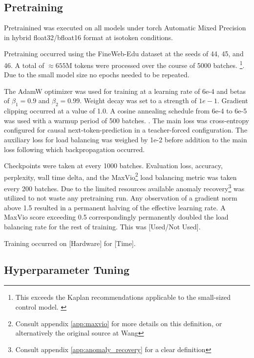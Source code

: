 \documentclass[11pt]{article}
\begin{document}
\subsection{Pretraining}

Pretrainined was executed on all models under torch Automatic Mixed Precision in hybrid float32/bfloat16 format at isotoken conditions.

Pretraining occurred using the FineWeb-Edu dataset at the seeds of 44, 45, and 46. \cite{penedo2024fineweb} A total of $\approx 655\mathrm{M}$ tokens were processed over the course of 5000 batches. \footnote{This exceeds the Kaplan recommendations applicable to the small-sized control model. \cite{kaplan2020scaling}}. Due to the small model size no epochs needed to be repeated.

The AdamW optimizer was used for training at a learning rate of 6e-4 and betas of $\beta_1=0.9$ and $\beta_2 = 0.99$. Weight decay was set to a strength of  $1e-1$. Gradient clipping occurred at a value of 1.0. A cosine annealing schedule from 6e-4 to 6e-5 was used with a warmup period of 500 batches. \cite{radford2019language}. The main loss was cross-entropy configured for causal next-token-prediction in a teacher-forced configuration. The auxiliary loss for load balancing was weighed by 1e-2 before addition to the main loss following which backpropagation occurred. \cite{fedus2021switch}

Checkpoints were taken at every 1000 batches. Evaluation loss, accuracy, perplexity, wall time delta, and the MaxVio\footnote{Consult appendix \ref{app:maxvio} for more details on this definition, or alternatively the original source at Wang\cite{wang2024auxiliarylossfree}} load balancing metric was taken every 200 batches. Due to the limited resources available anomaly recovery\footnote{Consult appendix \ref{app:anomaly_recovery} for a clear definition} was utilized to not waste any pretraining run. Any observation of a gradient norm above 1.5 resulted in a permanent halving of the effective learning rate. A MaxVio score exceeding 0.5 correspondingly permanently doubled the load balancing rate for the rest of training. This was [Used/Not Used].

Training occurred on [Hardware] for [Time].


\subsection{Hyperparameter Tuning}
\label{app:hyperparameter_tuning}
\end{document}
